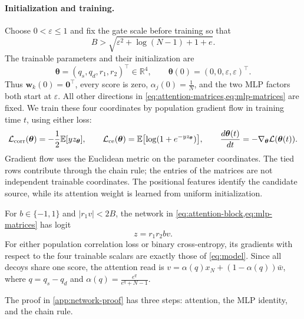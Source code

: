 \paragraph{Initialization and training.}
Choose $0<\varepsilon\le1$ and fix the gate scale before training so that
\begin{equation}
 B>\sqrt{\varepsilon^2+\log(N-1)+1+e}.
 \label{eq:gate-bound}
\end{equation}
The trainable parameters and their initialization are
\begin{equation}
 \bm\theta=(q_s,q_d,r_1,r_2)^\top\in\mathbb R^4,\qquad
 \bm\theta(0)=(0,0,\varepsilon,\varepsilon)^\top.
 \label{eq:initialization}
\end{equation}
Thus $\bm w_k(0)=\bm0^\top$, every score is zero, $\alpha_j(0)=\tfrac{1}{N}$,
and the two MLP factors both start at $\varepsilon$.
All other directions in \cref{eq:attention-matrices,eq:mlp-matrices} are fixed.
We train these four coordinates by population gradient flow in training time $t$, using either loss:
\begin{equation}
 \mathcal L_{\mathrm{corr}}(\bm\theta)=-\frac{1}{2}\mathbb E[y z_{\bm\theta}],\qquad
 \mathcal L_{\mathrm{ce}}(\bm\theta)=\mathbb E\bigl[\log(1+e^{-y z_{\bm\theta}})\bigr],\qquad
 \frac{d\bm\theta(t)}{dt}=-\nabla_{\bm\theta}\mathcal L(\bm\theta(t)).
 \label{eq:parameter-flow}
\end{equation}
Gradient flow uses the Euclidean metric on the parameter coordinates.
The tied rows contribute through the chain rule; the entries of the matrices are not independent trainable coordinates.
The positional features identify the candidate source, while its attention weight is learned from uniform initialization.

\begin{proposition}
\label{prop:realization}
For $b\in\{-1,1\}$ and $|r_1v|<2B$, the network in \cref{eq:attention-block,eq:mlp-matrices} has logit
\begin{equation}
 z=r_1r_2b v.
 \label{eq:model}
\end{equation}
For either population correlation loss or binary cross-entropy, its gradients with respect to the four trainable scalars
are exactly those of \cref{eq:model}. Since all decoys share one score, the attention read is
$v=\alpha(q)x_N+(1-\alpha(q))\bar w$, where
$q=q_s-q_d$ and $\alpha(q)=\tfrac{e^q}{e^q+N-1}$.
\end{proposition}
The proof in \cref{app:network-proof} has three steps: attention, the MLP identity, and the chain rule.

